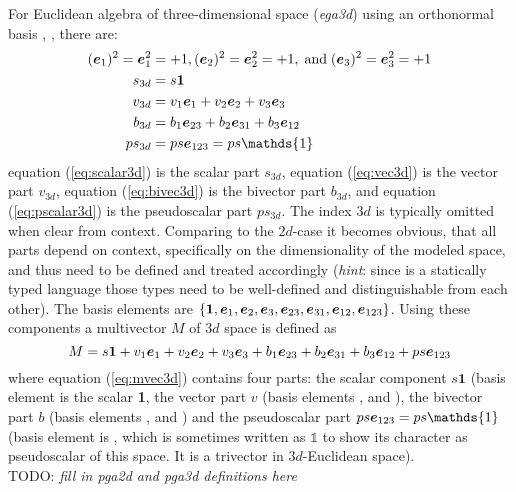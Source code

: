 For Euclidean algebra of three-dimensional space (\emph{ega3d}) using an orthonormal basis
, ,  there are:
\begin{subequations}
    \begin{align}
        (\bv{1})^2 = \bv{1}^2 & = +1, (\bv{2})^2 = \bv{2}^2 = +1,
        \;\text{and}\; (\bv{3})^2 = \bv{3}^2 = +1
        \label{eq:ega3d_base_vec} \\ 
        s_{3d} & = s\bm{1}
        \label{eq:scalar3d} \\
        v_{3d} & = v_1\bv{1} + v_2\bv{2} + v_3\bv{3} 
        \label{eq:vec3d} \\ 
        b_{3d} & = b_1\bv{23} + b_2\bv{31} + b_3\bv{12} 
        \label{eq:bivec3d} \\ 
        ps_{3d} & = ps \bv{123}  = ps\mathds{1}
        \label{eq:pscalar3d}
    \end{align}
\end{subequations}
equation (\ref{eq:scalar3d}) is the scalar part $s_{3d}$, equation (\ref{eq:vec3d}) is the
vector part $v_{3d}$, equation (\ref{eq:bivec3d}) is the bivector part $b_{3d}$, and
equation (\ref{eq:pscalar3d}) is the pseudoscalar part $ps_{3d}$. The index $3d$ is
typically omitted when clear from context. Comparing to the $2d$-case it becomes obvious,
that all parts depend on context, specifically on the dimensionality of the modeled space,
and thus need to be defined and treated accordingly (\emph{hint}: since \Cpp is a
statically typed language those types need to be well-defined and distinguishable from
each other). The basis elements are $\{\bm{1}, \bm{e}_{1}, \bm{e}_{2}, \bm{e}_{3}, \bm{e}_{23}, \bm{e}_{31},
\bm{e}_{12}, \bm{e}_{123}\}$. Using these components a multivector $M$ of $3d$ space is defined as
\begin{equation}
    M = s \bm{1} + v_1\bm{e}_{1} + v_2\bm{e}_{2} + v_3\bm{e}_{3} 
    + b_1\bm{e}_{23} + b_2\bm{e}_{31} + b_3\bm{e}_{12} + ps\bm{e}_{123}
    \label{eq:mvec3d}  
\end{equation}
where equation (\ref{eq:mvec3d}) contains four parts: the scalar component $s\bm{1}$
(basis element is the scalar \textbf{1}, the vector part $v$ (basis elements ,
 and ), the bivector part $b$ (basis elements ,  and )
and the pseudoscalar part $ps \bv{123} = ps \mathds{1}$ (basis element is , which
is sometimes written as $\mathds{1}$ to show its character as pseudoscalar of this space.
It is a trivector in $3d$-Euclidean space). \\


TODO: \emph{fill in pga2d and pga3d definitions here} \\


